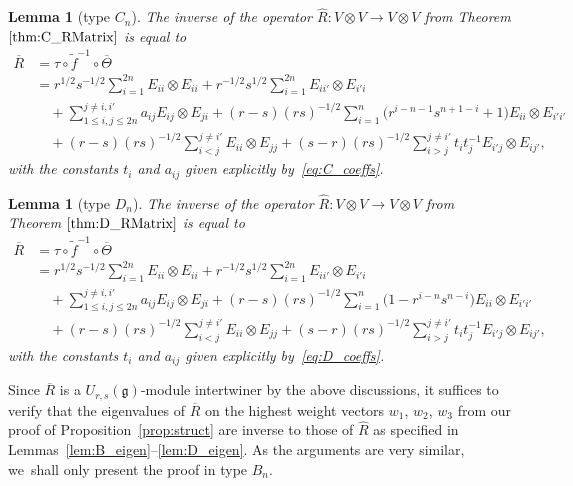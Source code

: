 \documentclass[pdftex]{sigma}
\numberwithin{equation}{section}
\newtheorem{Lemma}[Theorem]{Lemma}
\newcommand{\fg}{\mathfrak{g}}
\newcommand{\uu}{U_{r,s}(\fg)}
\begin{document}
\begin{Lemma}[type $C_{n}$]%
The inverse of the operator $\hat{R}\colon V \otimes V \to V \otimes V$ from Theorem $\ref{thm:C_RMatrix}$ is equal to
\begin{align}
 \overline{R} &= \tau \circ \widetilde{f}^{-1} \circ \overline{\Theta} \nonumber\\
 &=
 r^{1/2}s^{-1/2}\sum_{i = 1}^{2n} E_{ii} \otimes E_{ii}
 + r^{-1/2}s^{1/2}\sum_{i = 1}^{2n} E_{ii'} \otimes E_{i'i} \nonumber\\
 &\quad + \sum_{1\leq i,j\leq 2n}^{j\ne i,i'} a_{ij}E_{ij} \otimes E_{ji}
 + (r - s)(rs)^{-1/2}\sum_{i = 1}^{n}\bigl(r^{i - n- 1}s^{n + 1 - i} + 1\bigr)E_{ii} \otimes E_{i'i'}\nonumber \\
 &\quad + (r -s)(rs)^{-1/2}\sum_{i < j}^{j\neq i'} E_{ii} \otimes E_{jj}
 + (s - r)(rs)^{-1/2}\sum_{i > j}^{j\neq i'} t_{i}t_{j}^{-1}E_{i'j} \otimes E_{ij'},\label{eq:C_Inv}
\end{align}
with the constants $t_{i}$ and $a_{ij}$ given explicitly by~\eqref{eq:C_coeffs}.
\end{Lemma}

\begin{Lemma}[type $D_{n}$]\label{lem:D_Inverse}
The inverse of the operator $\hat{R}\colon V \otimes V \to V \otimes V$ from Theorem $\ref{thm:D_RMatrix}$ is equal to
\begin{align}
 \overline{R} &= \tau \circ \widetilde{f}^{-1} \circ \overline{\Theta} \nonumber\\
 &=r^{1/2}s^{-1/2}\sum_{i = 1}^{2n} E_{ii} \otimes E_{ii}
 + r^{-1/2}s^{1/2}\sum_{i = 1}^{2n} E_{ii'} \otimes E_{i'i} \nonumber\\
 &\quad + \sum_{1\leq i,j\leq 2n}^{j \neq i,i'} a_{ij}E_{ij} \otimes E_{ji}
 + (r - s)(rs)^{-1/2}\sum_{i = 1}^{n}\bigl(1 - r^{i- n}s^{n - i}\bigr) E_{ii} \otimes E_{i'i'} \nonumber\\
 &\quad + (r -s)(rs)^{-1/2}\sum_{i < j}^{j \neq i'} E_{ii} \otimes E_{jj}
 + (s - r)(rs)^{-1/2}\sum_{i > j}^{j \neq i'} t_{i}t_{j}^{-1}E_{i'j} \otimes E_{ij'},\label{eq:D_Inv}
\end{align}
with the constants $t_{i}$ and $a_{ij}$ given explicitly by~\eqref{eq:D_coeffs}.
\end{Lemma}

Since $\overline{R}$ is a $\uu$-module intertwiner by the above discussions, it suffices to verify that the eigenvalues of $\overline{R}$ on the highest weight vectors $w_1$, $w_2$, $w_3$ from our proof of Proposition~\ref{prop:struct} are inverse to those of $\hat{R}$ as specified in Lemmas~\ref{lem:B_eigen}--\ref{lem:D_eigen}. As the arguments are very similar, we~shall only present the proof in type $B_{n}$.
\end{document}
